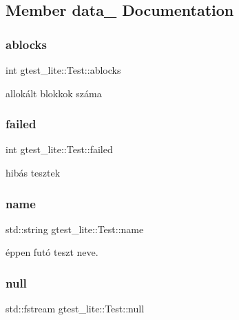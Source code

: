 \subsection{Member data_ Documentation}
\mbox{\label{structgtest__lite_1_1_test_a91d9c63794d2b9b49e0c48d897208560}} 
\subsubsection{ablocks}
{\footnotesize\ttfamily int gtest\+\_\+lite\+::\+Test\+::ablocks}



allokált blokkok száma 

\mbox{\label{structgtest__lite_1_1_test_a4fb6ee7bd903717d970e3f0504cdeeab}} 
\subsubsection{failed}
{\footnotesize\ttfamily int gtest\+\_\+lite\+::\+Test\+::failed}



hibás tesztek 

\mbox{\label{structgtest__lite_1_1_test_a8d495a42580e3ae337f9c4982136b700}} 
\subsubsection{name}
{\footnotesize\ttfamily std\+::string gtest\+\_\+lite\+::\+Test\+::name}



éppen futó teszt neve. 

\mbox{\label{structgtest__lite_1_1_test_af4784302d78bb004bcb20b7f75ec06c3}} 
\subsubsection{null}
{\footnotesize\ttfamily std\+::fstream gtest\+\_\+lite\+::\+Test\+::null}



